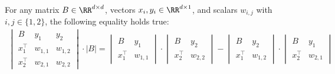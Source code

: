 \documentclass[11pt]{article}
\theoremstyle{definition}
\begin{document}
\begin{lemma}
	\label{lem:schur-determinant}
	For any matrix $B\in \RR^{d\times d}$, vectors $x_i,y_i \in \RR^{d\times 1}$, and scalars $w_{i,j}$ with $i,j \in \{1,2\}$, the following equality holds true:
	\begin{align}
		\label{eqn:determinant-uncrossing}
		\begin{vmatrix}
			B & y_1 & y_2 \\
			x_1^{\top}& w_{1,1} & w_{1,2}\\
			x_2^{\top}& w_{2,1} & w_{2,2}
		\end{vmatrix}\cdot |B|= \begin{vmatrix}
			B & y_1 \\
			x_1^{\top}& w_{1,1}
		\end{vmatrix}\cdot\begin{vmatrix}
			B & y_2 \\
			x_2^{\top}& w_{2,2}
		\end{vmatrix}- \begin{vmatrix}
			B & y_2 \\
			x_1^{\top}& w_{1,2}
		\end{vmatrix}\cdot\begin{vmatrix}
			B & y_1 \\
			x_2^{\top}& w_{2,1}
		\end{vmatrix}
	\end{align}
	
\end{lemma}
\end{document}
